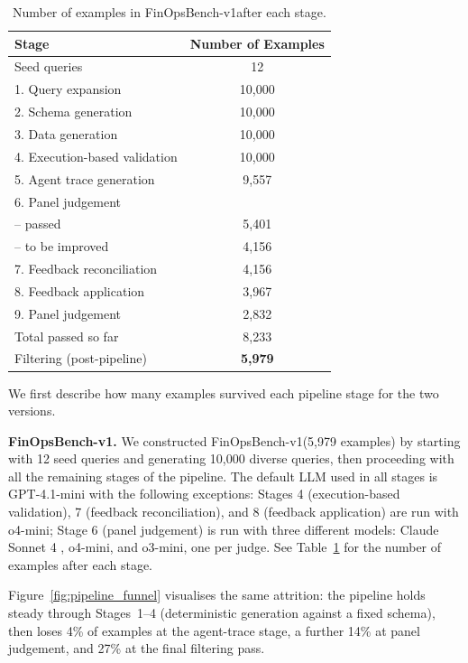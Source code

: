 \documentclass[11pt]{article}
\newcommand{\synthsubset}{FinOpsBench-v1}\xspace
\begin{document}
\begin{table}[t]
\centering
\small
\begin{tabular}{lc}
\toprule
\textbf{Stage} & \textbf{Number of Examples} \\
\midrule
Seed queries & 12 \\
1. Query expansion & 10,000 \\
2. Schema generation & 10,000 \\
3. Data generation & 10,000 \\
4. Execution-based validation & 10,000 \\
5. Agent trace generation & 9,557 \\
6. Panel judgement & \\
\quad -- passed & 5,401 \\
\quad -- to be improved & 4,156 \\
7. Feedback reconciliation & 4,156 \\
8. Feedback application & 3,967 \\
9. Panel judgement & 2,832 \\
\midrule
Total passed so far & 8,233 \\
Filtering (post-pipeline) & \textbf{5,979} \\
\bottomrule
\end{tabular}
\caption{Number of examples in \synthsubset after each stage.}
\label{tab:synthsubset_numbers}
\end{table}

We first describe how many examples survived each pipeline stage for the two versions.

\noindent \textbf{\synthsubset.} We constructed \synthsubset (5,979 examples) by starting with 12 seed queries and generating 10,000 diverse queries, then proceeding with all the remaining stages of the pipeline. The default LLM used in all stages is GPT-4.1-mini with the following exceptions: Stages 4 (execution-based validation), 7 (feedback reconciliation), and 8 (feedback application) are run with o4-mini; Stage 6 
(panel judgement) 
is run with three different models: Claude Sonnet 4 \citep{anthropic2025claude4}, o4-mini, and o3-mini, one per judge. See Table~\ref{tab:synthsubset_numbers} for the number of examples after each stage.

Figure~\ref{fig:pipeline_funnel} visualises the same attrition: the pipeline holds steady through Stages~1--4 (deterministic generation against a fixed schema), then loses 4\% of examples at the agent-trace stage, a further 14\% at 
panel
judgement, and 27\% at the final filtering pass.
\end{document}
